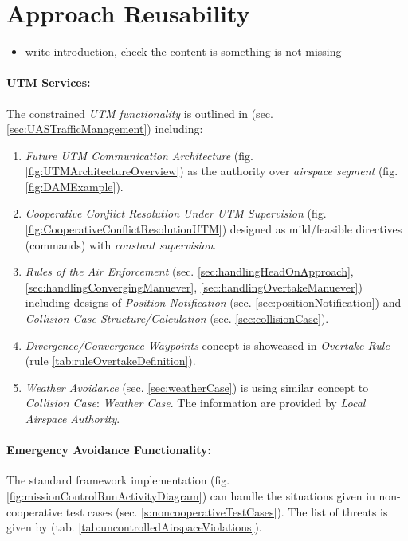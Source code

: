 \section{Approach Reusability}\label{s:approachReusability}
\begin{itemize}
    \item write introduction, check the content is something is not missing
\end{itemize}
\paragraph{UTM Services:} The constrained \emph{UTM functionality} is outlined in (sec. \ref{sec:UASTrafficManagement}) including:
\begin{enumerate}
    \item \emph{Future UTM Communication Architecture} (fig. \ref{fig:UTMArchitectureOverview}) as the authority over \emph{airspace segment} (fig. \ref{fig:DAMExample})\cite{gerdes2016dynamic}.
    
    \item \emph{Cooperative Conflict Resolution Under UTM Supervision} (fig. \ref{fig:CooperativeConflictResolutionUTM}) designed as mild/feasible directives (commands) with \emph{constant supervision}.
    
    \item \emph{Rules of the Air Enforcement} (sec. \ref{sec:handlingHeadOnApproach}, \ref{sec:handlingConvergingManuever}, \ref{sec:handlingOvertakeManuever}) including designs of \emph{Position Notification} (sec. \ref{sec:positionNotification}) and \emph{Collision Case Structure/Calculation} (sec. \ref{sec:collisionCase}).
    
    \item \emph{Divergence/Convergence Waypoints} concept is showcased in \emph{Overtake Rule} (rule \ref{tab:ruleOvertakeDefinition}). 
    
    \item \emph{Weather Avoidance} (sec. \ref{sec:weatherCase}) is using similar concept to \emph{Collision Case}: \emph{Weather Case}. The information are provided by \emph{Local Airspace Authority}.
    
\end{enumerate}

\paragraph{Emergency Avoidance Functionality:}  The standard framework implementation (fig. \ref{fig:missionControlRunActivityDiagram}) can handle the situations given in non-cooperative test cases (sec. \ref{s:noncooperativeTestCases}). The list of threats is given by (tab. \ref{tab:uncontrolledAirspaceViolations}). 

